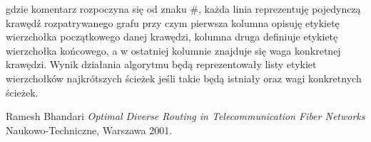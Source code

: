 \documentclass[10pt,a4paper]{article}
\begin{document}


gdzie komentarz rozpoczyna się od znaku \#, każda linia reprezentuję pojedynczą krawędź rozpatrywanego grafu przy czym pierwsza kolumna opisuję etykietę wierzchołka początkowego danej krawędzi, kolumna druga definiuje etykietę wierzchołka końcowego, a w ostatniej kolumnie znajduje się waga konkretnej krawędzi. Wynik działania algorytmu będą reprezentowały listy etykiet wierzchołków najkrótszych ścieżek jeśli takie będą istniały oraz wagi konkretnych ścieżek.

\begin{thebibliography}{9}
 Ramesh Bhandari \emph{Optimal Diverse Routing in Telecommunication Fiber Networks}
Naukowo-Techniczne, Warszawa 2001.
\end{thebibliography}
\end{document}
